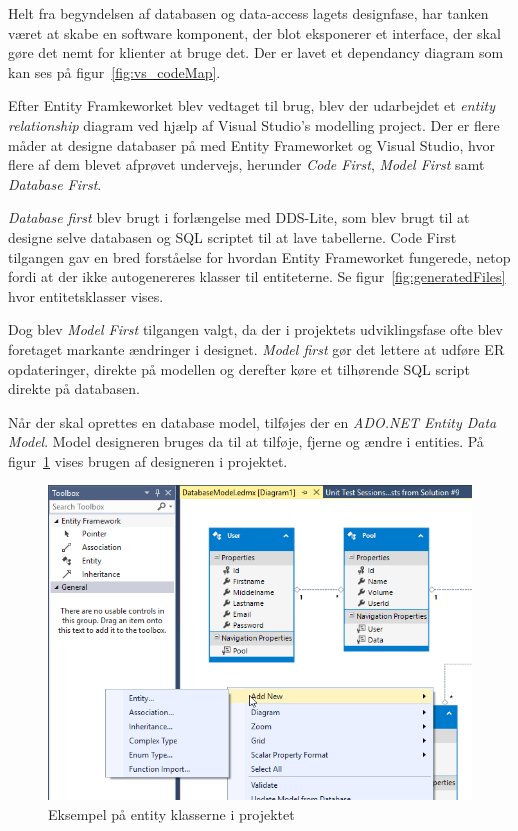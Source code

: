 Helt fra begyndelsen af databasen og data-access lagets designfase, har tanken været at skabe en software komponent, der blot eksponerer et interface, der skal gøre det nemt for klienter at bruge det. Der er lavet et dependancy diagram som kan ses på figur~\ref{fig:vs_codeMap}.

Efter Entity Framkeworket blev vedtaget til brug, blev der udarbejdet et \textit{entity relationship} diagram ved hjælp af Visual Studio's modelling project. Der er flere måder at designe databaser på med Entity Frameworket og Visual Studio, hvor flere af dem blevet afprøvet undervejs, herunder \textit{Code First}, \textit{Model First} samt \textit{Database First}.

\textit{Database first} blev brugt i forlængelse med DDS-Lite, som blev brugt til at designe selve databasen og SQL scriptet til at lave tabellerne. Code First tilgangen gav en bred forståelse for hvordan Entity Frameworket fungerede, netop fordi at der ikke autogenereres klasser til entiteterne. Se figur~\ref{fig:generatedFiles} hvor entitetsklasser vises.

Dog blev \textit{Model First} tilgangen valgt, da der i projektets udviklingsfase ofte blev foretaget markante ændringer i designet. \textit{Model first} gør det lettere at udføre ER opdateringer, direkte på modellen og derefter køre et tilhørende SQL script direkte på databasen. 

Når der skal oprettes en database model, tilføjes der en \textit{ADO.NET Entity Data Model}. Model designeren bruges da til at tilføje, fjerne og ændre i entities.
På figur~\ref{fig:modelDesigner} vises brugen af designeren i projektet.

\begin{figure}
	\centering
	\includegraphics[width=\linewidth]{figs/modelDesigner}
	\caption{Eksempel på entity klasserne i projektet}
	\label{fig:modelDesigner}
\end{figure}

